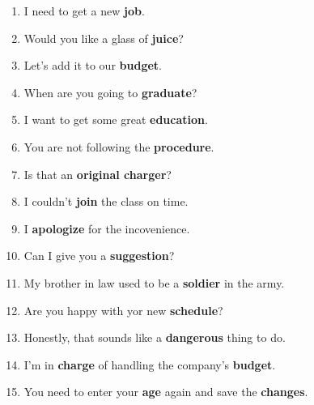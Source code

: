 \begin{enumerate}
  \item I need to get a new \textbf{job}.
  \item Would you like a glass of \textbf{juice}?
  \item Let's add it to our \textbf{budget}.
  \item When are you going to \textbf{graduate}?
  \item I want to get some great \textbf{education}.
  \item You are not following the \textbf{procedure}.
  \item Is that an \textbf{original charger}?
  \item I couldn't \textbf{join} the class on time.
  \item I \textbf{apologize} for the incovenience.
  \item Can I give you a \textbf{suggestion}?
  \item My brother in law used to be a \textbf{soldier} in the army.
  \item Are you happy with yor new \textbf{schedule}?
  \item Honestly, that sounds like a \textbf{dangerous} thing to do.
  \item I'm in \textbf{charge} of handling the company's \textbf{budget}.
  \item You need to enter your \textbf{age} again and save the \textbf{changes}.
\end{enumerate}

\newpage






